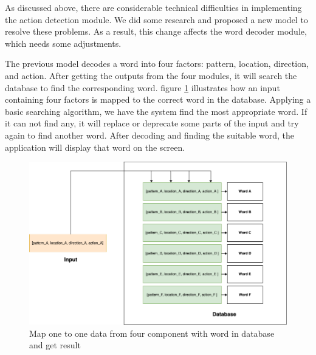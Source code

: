 











As discussed above, there are considerable technical difficulties in implementing the action detection module. We did some research and proposed a new model to resolve these problems. As a result, this change affects the word decoder module, which needs some adjustments.

The previous model decodes a word into four factors: pattern, location, direction, and action. After getting the outputs from the four modules, it will search the database to find the corresponding word. figure \ref{fig:Chap4-MapWord} illustrates how an input containing four factors is mapped to the correct word in the database. Applying a basic searching algorithm, we have the system find the most appropriate word. If it can not find any, it will replace or deprecate some parts of the input and try again to find another word. After decoding and finding the suitable word, the application will display that word on the screen.

\begin{figure}[H]
	\centering
	\includegraphics[width=\textwidth]{img/Chap4/MapWord.png}
	\caption{Map one to one data from four component with word in database and get result}
	\label{fig:Chap4-MapWord}
\end{figure}

